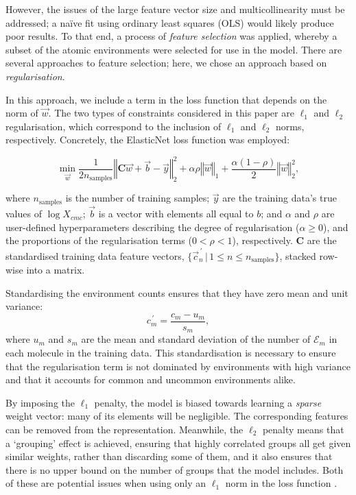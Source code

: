 However, the issues of the large feature vector size and multicollinearity must be addressed; a na\"ive fit using ordinary least squares (OLS) would likely produce poor results. To that end, a process of \emph{feature selection} was
applied, whereby a subset of the atomic environments were selected for use in the model. There are several approaches to feature selection\cite{liFeatureSelectionData2017}; here, we chose an approach based on \emph{regularisation}.

In this approach, we include a term in the loss function that depends on the
norm of $\vec{w}$. The two types of constraints considered in this paper are
$\ell_1$ and $\ell_2$ regularisation, which correspond to the inclusion of
$\ell_1$ and $\ell_2$ norms, respectively. Concretely, the ElasticNet
\cite{zouRegularizationVariableSelection2005} loss function was employed:

\begin{equation}
    \label{eq:elastic}
    \min_{\vec{w}} { \frac{1}{2n_{\text{samples}}} \left \Vert \mathbf{C}\vec{w} + \vec{b}- \vec{y} \right \Vert_2 ^ 2 + \alpha\rho \left \Vert \vec{w} \right \Vert_1} + \frac{\alpha(1 - \rho)}{2} \left \Vert \vec{w} \right \Vert_2^2,
\end{equation}

where $n_{\text{samples}}$ is the number of training samples; $\vec{y}$ are the
training data's true values of $\log X_{cmc}$; $\vec{b}$ is a vector with
elements all equal to $b$; and $\alpha$ and $\rho$ are user-defined
hyperparameters describing the degree of regularisation ($\alpha \geq 0$), and
the proportions of the regularisation terms ($0 < \rho < 1$), respectively.
$\mathbf{C}$ are the standardised training data feature vectors,
$\{\vec{c}^{\,\prime}_n \,|\, 1 \leq n \leq n_\text{samples}\}$, stacked
row-wise into a matrix.

Standardising the environment counts ensures that they have zero mean and unit variance:
\begin{equation}
    \label{eq:standard-scaling}
    {c}^{\,\prime}_m = \frac{c_m - u_m}{s_m},
\end{equation}
where $u_m$ and $s_m$ are the mean and standard deviation of the number of $\mathcal{E}_m$ in each molecule in the training data. This standardisation is necessary to ensure that the regularisation term is not dominated by
environments with high variance and that it accounts for common and uncommon environments alike.

By imposing the $\ell_1$ penalty, the model is biased towards learning a
\emph{sparse} weight vector: many of its elements will be negligible. The
corresponding features can be removed from the representation. Meanwhile, the
$\ell_2$ penalty means that a `grouping' effect is achieved, ensuring that
highly correlated groups all get given similar weights, rather than discarding
some of them, and it also ensures that there is no upper bound on the number of
groups that the model includes. Both of these are potential issues when using
only an $\ell_1$ norm in the loss function
\cite{efronLeastAngleRegression2004,zouRegularizationVariableSelection2005}.


